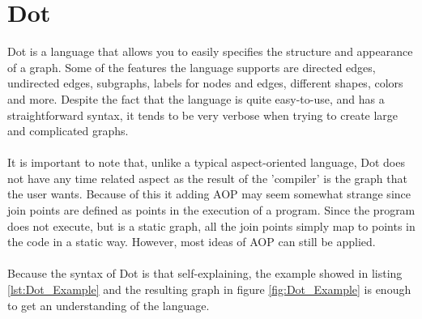 \documentclass[a4paper]{report}
\begin{document}
\chapter{Dot}
\label{chap:Dot}
Dot is a language that allows you to easily specifies the structure and appearance of a graph. Some of the features the language supports  are directed edges, undirected edges, subgraphs, labels for nodes and edges, different shapes, colors and more. Despite the fact that the language is quite easy-to-use, and has a straightforward syntax, it tends to be very verbose when trying to create large and complicated graphs.\\
\\
It is important to note that, unlike a typical aspect-oriented language, Dot does not have any time related aspect as the result of the 'compiler' is the graph that the user wants. Because of this it adding AOP may seem somewhat strange since join points are defined as points in the execution of a program. Since the program does not execute, but is a static graph, all the join points simply map to points in the code in a static way. However, most ideas of AOP can still be applied.\\
\\
Because the syntax of Dot is that self-explaining, the example showed in listing \ref{lst:Dot_Example} and the resulting graph in figure \ref{fig:Dot_Example} is enough to get an understanding of the language.\\
\end{document}
